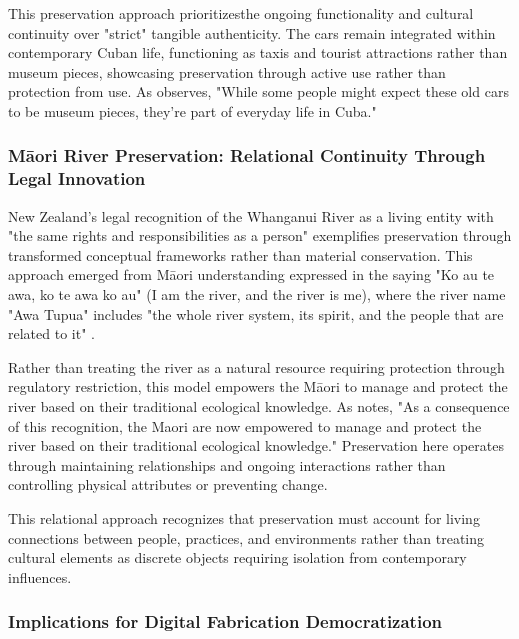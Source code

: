 \vspace{0.5cm}

This preservation approach prioritizesthe ongoing functionality and cultural continuity over "strict" tangible authenticity. The cars remain integrated within contemporary Cuban life, functioning as taxis and tourist attractions rather than museum pieces, showcasing preservation through active use rather than protection from use. As \citet{adewale2024} observes, "While some people might expect these old cars to be museum pieces, they're part of everyday life in Cuba."

\subsubsection{Māori River Preservation: Relational Continuity Through Legal Innovation}

New Zealand's legal recognition of the Whanganui River as a living entity with "the same rights and responsibilities as a person" \citep{paremata2017} exemplifies preservation through transformed conceptual frameworks rather than material conservation. This approach emerged from Māori understanding expressed in the saying "Ko au te awa, ko te awa ko au" (I am the river, and the river is me), where the river name "Awa Tupua" includes "the whole river system, its spirit, and the people that are related to it" \citep{nationallibrarynz2017}.

\vspace{0.5cm}

Rather than treating the river as a natural resource requiring protection through regulatory restriction, this model empowers the Māori to manage and protect the river based on their traditional ecological knowledge. As \citet{vijaykuma2019} notes, "As a consequence of this recognition, the Maori are now empowered to manage and protect the river based on their traditional ecological knowledge." Preservation here operates through maintaining relationships and ongoing interactions rather than controlling physical attributes or preventing change.

\vspace{0.5cm}

This relational approach recognizes that preservation must account for living connections between people, practices, and environments rather than treating cultural elements as discrete objects requiring isolation from contemporary influences.

\subsubsection{Implications for Digital Fabrication Democratization}

